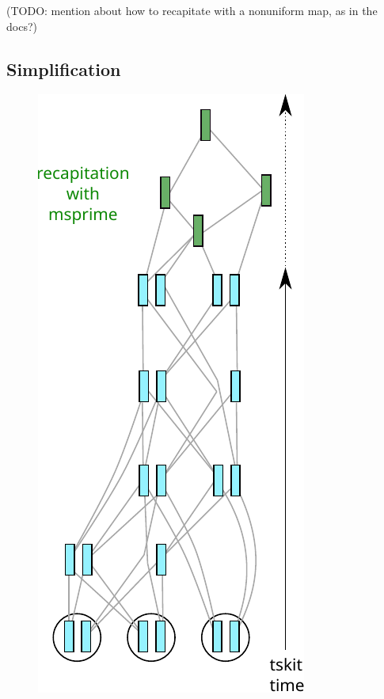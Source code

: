 \documentclass[12pt]{article}
\begin{document}
(TODO: mention about how to recapitate with a nonuniform map, as in the docs?)


\subsection*{Simplification}

\begin{figure}
\centering
    \includegraphics{figures/pedigree_recapitate}

\end{figure}
\end{document}
